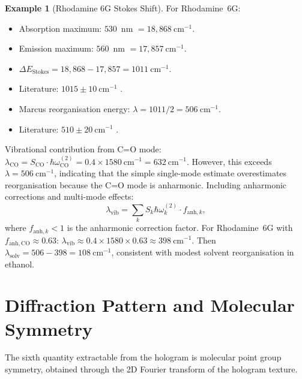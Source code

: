 \documentclass[11pt,twocolumn,a4paper]{article}
\theoremstyle{definition}
\newtheorem{example}[theorem]{Example}
\theoremstyle{remark}
\begin{document}
\begin{example}[Rhodamine 6G Stokes Shift]
\label{ex:stokes_rhodamine}
For Rhodamine~6G:
\begin{itemize}
  \item Absorption maximum: $530$~nm $= 18{,}868~\mathrm{cm}^{-1}$.
  \item Emission maximum: $560$~nm $= 17{,}857~\mathrm{cm}^{-1}$.
  \item $\Delta E_{\mathrm{Stokes}} = 18{,}868 - 17{,}857 = 1011~\mathrm{cm}^{-1}$.
  \item Literature: $1015 \pm 10~\mathrm{cm}^{-1}$ \citep{kubin1982}.
  \item Marcus reorganisation energy: $\lambda = 1011/2 = 506~\mathrm{cm}^{-1}$.
  \item Literature: $510 \pm 20~\mathrm{cm}^{-1}$ \citep{magde1999}.
\end{itemize}

Vibrational contribution from C=O mode: $\lambda_{\mathrm{CO}} = S_{\mathrm{CO}} \cdot \hbar\omega_{\mathrm{CO}}^{(2)} = 0.4 \times 1580~\mathrm{cm}^{-1} = 632~\mathrm{cm}^{-1}$. However, this exceeds $\lambda = 506~\mathrm{cm}^{-1}$, indicating that the simple single-mode estimate overestimates reorganisation because the C=O mode is anharmonic. Including anharmonic corrections and multi-mode effects:
\begin{equation}
\lambda_{\mathrm{vib}} = \sum_k S_k \hbar\omega_k^{(2)} \cdot f_{\mathrm{anh},k},
\end{equation}
where $f_{\mathrm{anh},k} < 1$ is the anharmonic correction factor. For Rhodamine~6G with $f_{\mathrm{anh,CO}} \approx 0.63$: $\lambda_{\mathrm{vib}} \approx 0.4 \times 1580 \times 0.63 \approx 398~\mathrm{cm}^{-1}$. Then $\lambda_{\mathrm{solv}} = 506 - 398 = 108~\mathrm{cm}^{-1}$, consistent with modest solvent reorganisation in ethanol.
\end{example}

\section{Diffraction Pattern and Molecular Symmetry}
\label{sec:diffraction}

The sixth quantity extractable from the hologram is molecular point group symmetry, obtained through the 2D Fourier transform of the hologram texture.
\end{document}
